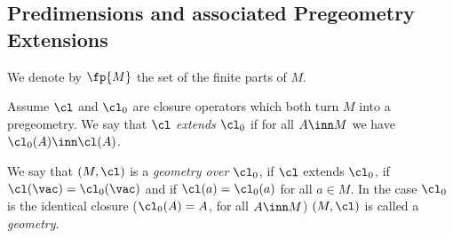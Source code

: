 %
%
%
%

\subsection{Predimensions and associated Pregeometry Extensions}\label{pregextsec}
We denote by $\fp{M}$ the set of the finite parts of $M$.
\begin{dfn}\label{pregext}
Assume $\cl$ and $\cl_{0}$ are closure operators which both turn $M$ into a pregeometry.
We say that $\cl$ {\em extends} $\cl_{0}$ if for all $A\inn M$ we have $\cl_{0}(A)\inn\cl(A)$.

We say that $(M,\cl)$ is a {\em geometry over} $\cl_{0}$, if $\cl$ extends $\cl_{0}$, if $\cl(\vac)=\cl_{0}(\vac)$
and if $\cl(a)=\cl_{0}(a)$ for all $a\in M$. In the case $\cl_{0}$ is the identical closure ($\cl_{0}(A)=A$, for all $A\inn M$)
$(M,\cl)$ is called a {\em geometry}.
\end{dfn}

